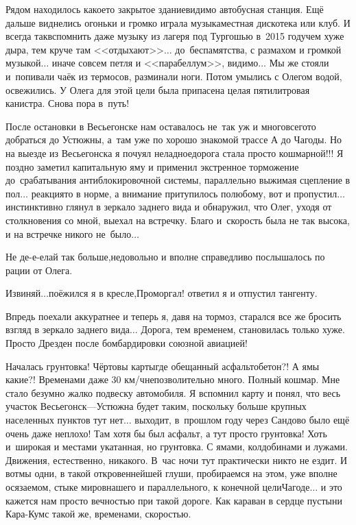 Рядом находилось какое\sdash то закрытое здание\mdash видимо автобусная станция. Ещё дальше виднелись огоньки и громко играла музыка\mdash местная дискотека или клуб. И всегда так\mdash вспомнить даже музыку из лагеря под Тургошью в~2015 году\mdash чем хуже дыра, тем круче там <<отдыхают>>$\ldots$ до~беспамятства, с размахом и громкой музыкой$\ldots$ иначе совсем петля и <<парабеллум>>, видимо$\ldots$ Мы же стояли и~попивали чаёк из термосов, разминали ноги. Потом умылись с Олегом водой, освежились. У Олега для этой цели была припасена целая пятилитровая канистра. Снова пора в~путь!

После остановки в Весьегонске нам оставалось не~так уж и много\mdash всего\sdash то добраться до Устюжны, а~там уже по хорошо знакомой трассе А до Чагоды. Но на выезде из Весьегонска я почуял неладное\mdash дорога стала просто кошмарной!!! Я поздно заметил капитальную яму и применил экстренное торможение до~срабатывания антиблокировочной системы, параллельно выжимая сцепление в пол$\ldots$ реакция\sdash то в норме, а внимание притупилось по\sdash любому, вот и пропустил$\ldots$ инстинктивно глянул в зеркало заднего вида и обнаружил, что Олег, уходя от столкновения со мной, выехал на встречку. Благо и~скорость была не так высока, и на встречке никого не~было$\ldots$ 

\diagdash Не де-е-елай так больше,\mdash недовольно и вполне справедливо послышалось по рации от Олега. 

\diagdash Извиняй$\ldots$\mdash поёжился я в кресле,\mdash Проморгал! \mdash ответил я и отпустил тангенту.

Впредь поехали аккуратнее и теперь я, давя на тормоз, старался все же бросить взгляд в зеркало заднего вида$\ldots$ Дорога, тем временем, становилась только хуже. Просто Дрезден после бомбардировки союзной авиацией! 

Началась грунтовка! Чёртовы карты\mdash где обещанный асфальтобетон?! А ямы какие?! Временами даже 30 км/ч\mdash непозволительно много. Полный кошмар. Мне стало безумно жалко подвеску автомобиля. Я вспомнил карту и понял, что весь участок Весьегонск\thinspace\nobreakdash---\thinspace Устюжна будет таким, поскольку больше крупных населенных пунктов тут нет$\ldots$ выходит, в~прошлом году через Сандово было ещё очень даже неплохо! Там хотя бы был асфальт, а тут просто грунтовка! Хоть и~широкая и местами укатанная, но грунтовка. С ямами, колдобинами и лужами. Движения, естественно, никакого. В~час ночи тут практически никто не ездит. И вот\mdash мы одни, в такой откровеннейшей глуши, пробираемся на этом, уже вполне осязаемом, стыке миров\mdash нашего и параллельного, к конечной цели\mdash Чагоде$\ldots$ и это кажется нам просто вечностью при такой дороге. Как караван в сердце пустыни Кара-Кум\mdash с такой же, временами, скоростью.

